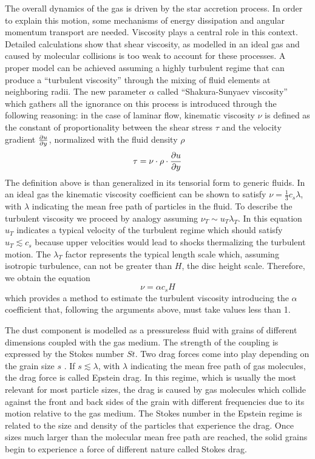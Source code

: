 \documentclass[a4paper,10pt]{report}
\begin{document}
The overall dynamics of the gas is driven by the star accretion process. In order to explain this motion, some mechanisms of energy dissipation and angular momentum transport
are needed. Viscosity plays a central role in this context. Detailed calculations show that shear viscosity, 
as modelled in an ideal gas and caused by molecular collisions is too weak to account for these processes. 
A proper model can be achieved assuming a highly turbulent regime that can produce a ``turbulent viscosity'' through the mixing of fluid elements
at neighboring radii. The new parameter $\alpha$
called ``Shakura-Sunyaev viscosity'' \cite{ssviscosity} which gathers all the ignorance on this process is introduced through the following reasoning:
in the case of laminar flow, kinematic viscosity $\nu$ is defined as the constant of 
proportionality between the shear stress $\tau$ and the velocity gradient  $\pdv{u}{y}$, normalized with the fluid density $\rho$
\begin{equation}
    \tau = \nu \cdot \rho \cdot \pdv{u}{y}
\end{equation}
The definition above is than generalized in its tensorial form to generic fluids.
In an ideal gas the kinematic viscosity coefficient can be shown to satisfy $\nu = \frac{1}{3}c_s\lambda$,
with $\lambda$ indicating the mean free path of particles in the fluid.
To describe the turbulent viscosity we proceed by analogy assuming $\nu_T \sim u_T \lambda_T$. In this equation $u_T$ indicates a typical velocity of the turbulent regime
which should 
satisfy $u_T \lesssim c_s$ because upper velocities would lead to shocks thermalizing the turbulent motion.
The $\lambda_T$ factor 
represents the typical length scale which, assuming isotropic turbulence, can not be greater than $H$, the disc height scale.
Therefore, we obtain the equation
\begin{equation}
    \nu = \alpha c_s H
\end{equation}
which provides a method to estimate the turbulent viscosity introducing the $\alpha$ coefficient that, following the arguments above,
must take values less than 1.

The dust component is modelled as a pressureless fluid with grains of different dimensions coupled with the gas medium. 
The strength of the coupling is expressed by the Stokes number $St$.
Two drag forces come into play depending on the grain size $s$ \cite[pp. 110,111]{book_planet_form}. 
If $s \lesssim \lambda$, with $\lambda$ indicating the mean free path of gas molecules, 
the drag force is called Epstein drag. 
In this regime, which is usually the most relevant for most particle sizes, 
the drag is caused by gas molecules which collide against the front and back sides of the grain with different 
frequencies due to its motion relative to the gas medium.
The Stokes number in the Epstein regime is related to the size and density of the particles that experience the drag.
Once sizes much larger than the molecular 
mean free path are reached, the solid grains begin to experience a force of different nature called Stokes drag.
\end{document}

